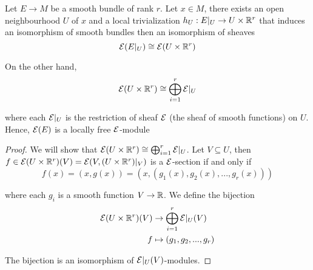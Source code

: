 \begin{remark}
	Let $E \to M$ be a smooth bundle of rank $r$. Let $x \in M$, there exists an open neighbourhood $U$ of $x$ and a local trivialization $h_U: E\vert_U \to U \times \mathbb{R}^r$ that induces an isomorphism of smooth bundles then an isomorphism of sheaves 
	$$
		\mathcal{E}(E\vert_U) \cong \mathcal{E}(U \times \mathbb{R}^r)
	$$
	
	On the other hand, 
	$$
		\mathcal{E}(U \times \mathbb{R}^r) \cong \bigoplus_{i=1}^r \mathcal{E}\vert_U
	$$
	
	where each $\mathcal{E}\vert_U$ is the restriction of sheaf $\mathcal{E}$ (the sheaf of smooth functions) on $U$. Hence, $\mathcal{E}(E)$ is a locally free $\mathcal{E}$-module
	
	\begin{proof}
		We will show that $\mathcal{E}(U \times \mathbb{R}^r) \cong \bigoplus_{i=1}^r \mathcal{E}\vert_U$. Let $V \subseteq U$, then $f \in \mathcal{E}(U \times \mathbb{R}^r)(V) = \mathcal{E}(V, (U \times \mathbb{R}^r)\vert_V)$ is a $\mathcal{E}$-section if and only if
		$$
		f(x) = (x, g(x)) = (x, (g_1(x), g_2(x), ..., g_r(x)))
		$$
		
		where each $g_i$ is a smooth function $V \to \mathbb{R}$. We define the bijection
		\begin{align*}
			\mathcal{E}(U \times \mathbb{R}^r)(V) &\to \bigoplus_{i=1}^r \mathcal{E}\vert_U(V) \\
			f &\mapsto (g_1, g_2, ..., g_r)
		\end{align*}
		
		The bijection is an isomorphism of $\mathcal{E}\vert_U(V)$-modules.
	\end{proof}
\end{remark}

